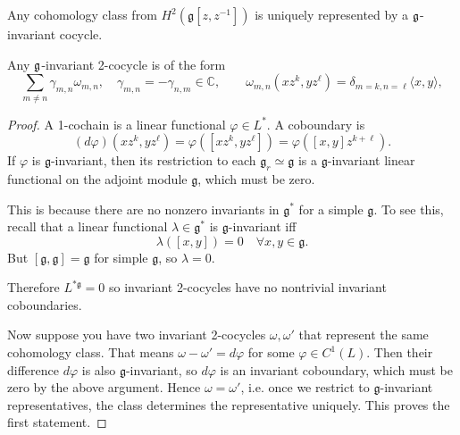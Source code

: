 \documentclass[12pt]{article}
\begin{document}
\begin{proposition}
    Any cohomology class from $H^2(\mathfrak{g}[z,z^{-1}])$ is uniquely represented by a $\mathfrak{g}$-invariant cocycle.

    Any $\mathfrak{g}$-invariant 2-cocycle is of the form
    \[
        \sum_{m\neq n} \gamma_{m,n} \omega_{m,n}, \quad
        \gamma_{m,n} = -\gamma_{n,m} \in \mathbb{C}, \qquad
        \omega_{m,n}(xz^k, yz^\ell) = \delta_{m=k,n=\ell} \langle x,y\rangle,
    \]
\end{proposition}

\begin{proof}
    A 1-cochain is a linear functional $\varphi \in L^*$. A coboundary is
    \[
        (d\varphi)(x z^k, y z^\ell) = \varphi([x z^k, y z^\ell]) = \varphi([x,y]z^{k+\ell}).
    \]
    If $\varphi$ is $\mathfrak{g}$-invariant, then its restriction to each $\mathfrak{g}_{r} \simeq \mathfrak{g}$ is a $\mathfrak{g}$-invariant linear functional on the adjoint module $\mathfrak{g}$, which must be zero.

    This is because there are no nonzero invariants in $\mathfrak{g}^*$ for a simple $\mathfrak{g}$. To see this, recall that a linear functional $\lambda \in \mathfrak{g}^*$ is $\mathfrak{g}$-invariant iff
    \[\lambda([x,y]) = 0 \quad \forall x,y \in \mathfrak{g}.\]
    But $[\mathfrak{g},\mathfrak{g}] = \mathfrak{g}$ for simple $\mathfrak{g}$, so $\lambda = 0$.

    Therefore $L^{*\mathfrak{g}} = 0$ so invariant 2-cocycles have no nontrivial invariant coboundaries.

    Now suppose you have two invariant 2-cocycles $\omega,\omega'$ that represent the same cohomology class. That means $\omega - \omega' = d\varphi$ for some $\varphi \in C^1(L)$. Then their difference $d\varphi$ is also $\mathfrak g$-invariant, so $d\varphi$ is an invariant coboundary, which must be zero by the above argument. Hence $\omega = \omega'$, i.e. once we restrict to $\mathfrak{g}$-invariant representatives, the class determines the representative uniquely. This proves the first statement.


\end{proof}
\end{document}
